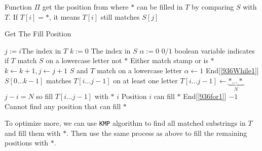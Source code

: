 Function $\Pi$ get the position from where $\ast$ can be filled in $T$ by comparing $S$ with $T$. If $T[i]=\ast$, it means $T[i]$ still matches $S[j]$
\begin{algorithm}[H]
\caption{Get The Fill Position}
\begin{algorithmic}[1]
 \label{936for1}
\State $j:=i$\Comment The index in $T$
\State $k:=0$ \Comment The index in $S$
\State $\alpha:=0$ \Comment $0/1$ boolean variable indicates if $T$ match $S$ on a lowercase letter not $\ast$
 \label{936While1}
 \Comment Either match stamp or is $\ast$
\State $k\gets k+1, j\gets j+1$
 \Comment $S$ and $T$ match on a lowercase letter
\State $\alpha\gets 1$
\EndIf
\EndIf
\EndWhile \Comment End[\ref{936While1}]
 \Comment $S[0\ldots k-1]$ matches $T[i\ldots j-1]$ on at least one letter
\State $T[i\ldots j-1] \gets \underbrace{\ast\ldots\ast}_{N}$ \Comment $j-i = N$ so fill $T[i\ldots j-1]$ with $\ast$
\State \Return $i$ \Comment Position $i$ can fill $\ast$
\EndIf
\EndFor \Comment End[\ref{936for1}]
\State \Return $-1$ \Comment Cannot find any position that can fill $\ast$
\EndFunction
\end{algorithmic}
\end{algorithm}
To optimize more, we can use \texttt{KMP} algorithm to find all matched substrings in $T$ and fill them with $\ast$. Then use the same process as above to fill the remaining positions with $\ast$. 

